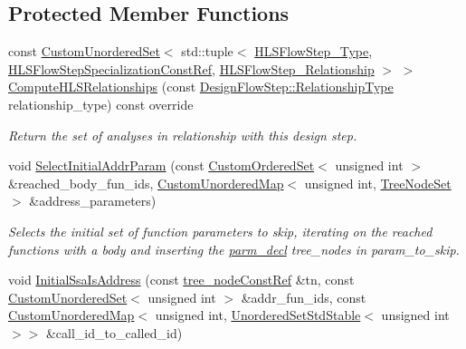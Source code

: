 \subsection*{Protected Member Functions}
\begin{DoxyCompactItemize}
\item 
const \hyperlink{classCustomUnorderedSet}{Custom\+Unordered\+Set}$<$ std\+::tuple$<$ \hyperlink{hls__step_8hpp_ada16bc22905016180e26fc7e39537f8d}{H\+L\+S\+Flow\+Step\+\_\+\+Type}, \hyperlink{hls__step_8hpp_a5fdd2edf290c196531d21d68e13f0e74}{H\+L\+S\+Flow\+Step\+Specialization\+Const\+Ref}, \hyperlink{hls__step_8hpp_a3ad360b9b11e6bf0683d5562a0ceb169}{H\+L\+S\+Flow\+Step\+\_\+\+Relationship} $>$ $>$ \hyperlink{classVcdSignalSelection_ae6f9acf47344a58c2d762308d3d0c97f}{Compute\+H\+L\+S\+Relationships} (const \hyperlink{classDesignFlowStep_a723a3baf19ff2ceb77bc13e099d0b1b7}{Design\+Flow\+Step\+::\+Relationship\+Type} relationship\+\_\+type) const override
\begin{DoxyCompactList}\small\item\em Return the set of analyses in relationship with this design step. \end{DoxyCompactList}\item 
void \hyperlink{classVcdSignalSelection_a4ddb42f1fb382699b8b364edf7e66cec}{Select\+Initial\+Addr\+Param} (const \hyperlink{classCustomOrderedSet}{Custom\+Ordered\+Set}$<$ unsigned int $>$ \&reached\+\_\+body\+\_\+fun\+\_\+ids, \hyperlink{custom__map_8hpp_ad1ed68f2ff093683ab1a33522b144adc}{Custom\+Unordered\+Map}$<$ unsigned int, \hyperlink{classTreeNodeSet}{Tree\+Node\+Set} $>$ \&address\+\_\+parameters)
\begin{DoxyCompactList}\small\item\em Selects the initial set of function parameters to skip, iterating on the reached functions with a body and inserting the \hyperlink{structparm__decl}{parm\+\_\+decl} tree\+\_\+nodes in param\+\_\+to\+\_\+skip. \end{DoxyCompactList}\item 
void \hyperlink{classVcdSignalSelection_a74df1de6a56940a7fa4e712fc22d9e02}{Initial\+Ssa\+Is\+Address} (const \hyperlink{tree__node_8hpp_a3cf5d02292c940f3892425a5b5fdec3c}{tree\+\_\+node\+Const\+Ref} \&tn, const \hyperlink{classCustomUnorderedSet}{Custom\+Unordered\+Set}$<$ unsigned int $>$ \&addr\+\_\+fun\+\_\+ids, const \hyperlink{custom__map_8hpp_ad1ed68f2ff093683ab1a33522b144adc}{Custom\+Unordered\+Map}$<$ unsigned int, \hyperlink{custom__set_8hpp_a1f63d303cef2790dc0a0ff7feae38f83}{Unordered\+Set\+Std\+Stable}$<$ unsigned int $>$$>$ \&call\+\_\+id\+\_\+to\+\_\+called\+\_\+id)
$$
\end{DoxyCompactItemize}
